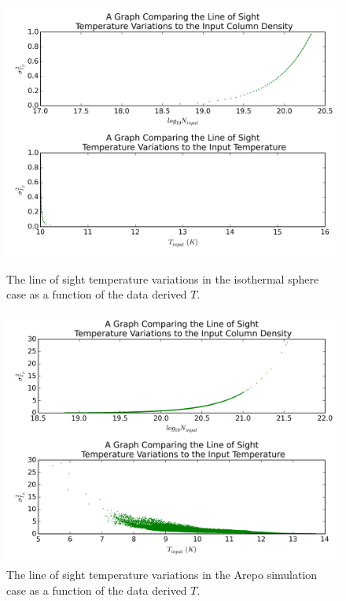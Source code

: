 \documentclass{report}
\begin{document}
\begin{figure}[H]
  \includegraphics[width=\linewidth]{../img/sim/sigma_T_inp.png}
  \caption{The line of sight temperature variations in the isothermal sphere case as a function of the data derived $T$.}\label{fig:sigma_T_iso}
\endminipage\hfill
{}
  \includegraphics[width=\linewidth]{../img/sph/sigma_T_inp.png}
  \caption{The line of sight temperature variations in the Arepo simulation case as a function of the data derived $T$.}\label{fig:sigma_T_sph}
\endminipage
\end{figure}
\end{document}
